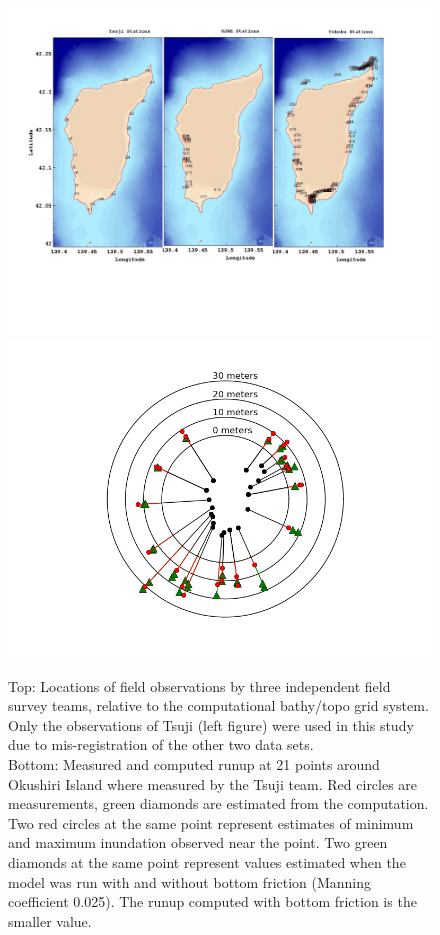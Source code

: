 \begin{figure}[ht]
\hfil\includegraphics[width=5.0in]{bp9/TeamStations.pdf}\hfil
\vskip 10pt
\hfil\includegraphics[width=5.0in]{bp9/runups.png}\hfil
\caption{\label{TeamStations}
Top: Locations of field observations by three independent field survey teams, relative to the computational bathy/topo grid system. Only the observations of Tsuji (left figure) were used in this study due to mis-registration of the other two data sets.\\
Bottom: Measured and computed runup at 21 points around Okushiri Island where measured by the Tsuji team.  Red circles are measurements, green diamonds are estimated from the computation.  Two red circles at the same point represent estimates of minimum and maximum inundation observed near the point.  Two green diamonds at the same point represent values estimated when the model was run with and without bottom friction (Manning coefficient 0.025).  The runup computed with bottom friction is the smaller value.
  }
\end{figure}


